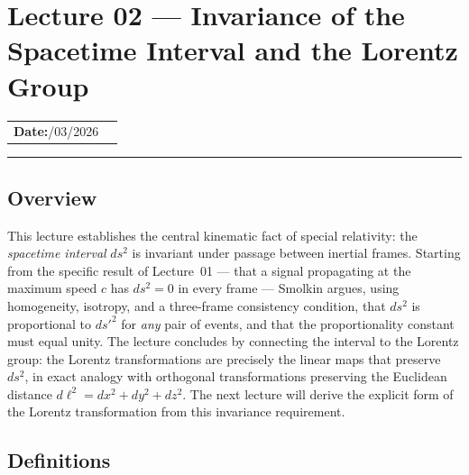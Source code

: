 
\section{Lecture 02 — Invariance of the Spacetime Interval and the
  Lorentz Group}\label{sec:lec02}

\begin{center}
\begin{tabular}{ll}
  \textbf{Date:}\quad 24/03/2026   & \\
\end{tabular}
\end{center}
\hrule\vspace{1.5em}
\subsection*{Overview}

This lecture establishes the central kinematic fact of special
relativity: the \emph{spacetime interval} $ds^2$ is invariant under
passage between inertial frames.  Starting from the specific result
of Lecture~01 — that a signal propagating at the maximum speed $c$
has $ds^2 = 0$ in every frame — Smolkin argues, using homogeneity,
isotropy, and a three-frame consistency condition, that $ds^2$ is
proportional to $ds'^2$ for \emph{any} pair of events, and that the
proportionality constant must equal unity.  The lecture concludes by
connecting the interval to the Lorentz group: the Lorentz
transformations are precisely the linear maps that preserve $ds^2$,
in exact analogy with orthogonal transformations preserving the
Euclidean distance $d\ell^2 = dx^2 + dy^2 + dz^2$.  The next
lecture will derive the explicit form of the Lorentz transformation
from this invariance requirement.

\subsection*{Definitions}


